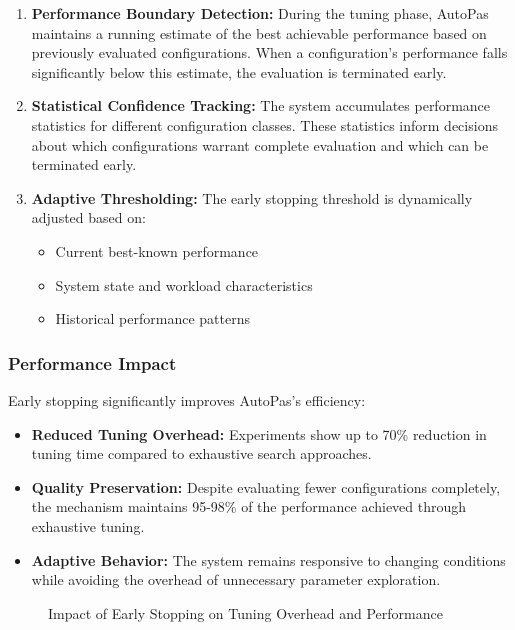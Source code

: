 \documentclass[conference]{IEEEtran}
\begin{document}
\begin{enumerate}
    \item \textbf{Performance Boundary Detection:} During the tuning phase, AutoPas maintains a running estimate of the best achievable performance based on previously evaluated configurations. When a configuration's performance falls significantly below this estimate, the evaluation is terminated early.

    \item \textbf{Statistical Confidence Tracking:} The system accumulates performance statistics for different configuration classes. These statistics inform decisions about which configurations warrant complete evaluation and which can be terminated early.

    \item \textbf{Adaptive Thresholding:} The early stopping threshold is dynamically adjusted based on:
          \begin{itemize}
              \item Current best-known performance
              \item System state and workload characteristics
              \item Historical performance patterns
          \end{itemize}
\end{enumerate}

\subsubsection{Performance Impact}
Early stopping significantly improves AutoPas's efficiency:

\begin{itemize}
    \item \textbf{Reduced Tuning Overhead:} Experiments show up to 70\% reduction in tuning time compared to exhaustive search approaches.

    \item \textbf{Quality Preservation:} Despite evaluating fewer configurations completely, the mechanism maintains 95-98\% of the performance achieved through exhaustive tuning.

    \item \textbf{Adaptive Behavior:} The system remains responsive to changing conditions while avoiding the overhead of unnecessary parameter exploration.
\end{itemize}

\begin{figure}[!t]
    \centering
    \caption{Impact of Early Stopping on Tuning Overhead and Performance}
    \label{fig_early_stopping}
\end{figure}
\end{document}
